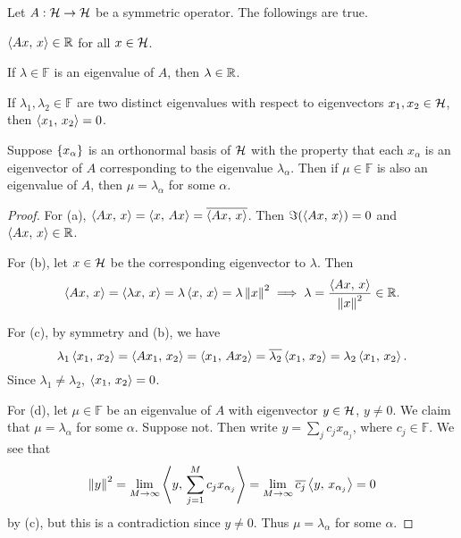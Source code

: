 \begin{proposition}\label{prop:sym_eval}
    Let $A:\mathcal{H}\to\mathcal{H}$ be a symmetric operator. The followings are true. 
    \begin{thmenum}
        \item $\left\langle {Ax},\, {x} \right\rangle\in\mathbb{R}$ for all $x\in\mathcal{H}$.
        \item If $\lambda\in\mathbb{F}$ is an eigenvalue of $A$, then $\lambda\in\mathbb{R}$. 
        \item If $\lambda_1,\lambda_2\in\mathbb{F}$ are two distinct eigenvalues 
        with respect to eigenvectors $x_1,x_2\in\mathcal{H}$, then $\left\langle {x_1},\, {x_2} \right\rangle = 0$. 
        \item Suppose $\left\{ {x_\alpha} \right\}$ is an orthonormal basis of $\mathcal{H}$ with 
        the property that each $x_\alpha$ is an eigenvector of $A$ corresponding 
        to the eigenvalue $\lambda_\alpha$. Then if $\mu\in\mathbb{F}$ is also 
        an eigenvalue of $A$, then $\mu = \lambda_\alpha$ for some $\alpha$.
    \end{thmenum}
\end{proposition}
\begin{proof}
    For (a), $\left\langle {Ax},\, {x} \right\rangle = \left\langle {x},\, {Ax} \right\rangle = \overline{\left\langle {Ax},\, {x} \right\rangle}$. Then 
    $\Im\pth{\inp{Ax}{x}} = 0$ and $\left\langle {Ax},\, {x} \right\rangle\in\mathbb{R}$.

    For (b), let $x\in\mathcal{H}$ be the corresponding eigenvector to $\lambda$. Then 
    \begin{equation*}
        \left\langle {Ax},\, {x} \right\rangle = \left\langle {\lambda x},\, {x} \right\rangle = \lambda\left\langle {x},\, {x} \right\rangle = \lambda\left\lVert {x} \right\rVert^2
        \implies \lambda = \frac{\left\langle {Ax},\, {x} \right\rangle}{\left\lVert {x} \right\rVert^2}\in\mathbb{R}.
    \end{equation*}

    For (c), by symmetry and (b), we have 
    \begin{equation*}
        \lambda_1\left\langle {x_1},\, {x_2} \right\rangle = \left\langle {Ax_1},\, {x_2} \right\rangle = \left\langle {x_1},\, {Ax_2} \right\rangle 
        = \overline{\lambda_2}\left\langle {x_1},\, {x_2} \right\rangle = \lambda_2\left\langle {x_1},\, {x_2} \right\rangle.
    \end{equation*}
    Since $\lambda_1\neq\lambda_2$, $\left\langle {x_1},\, {x_2} \right\rangle = 0$. 

    For (d), let $\mu\in\mathbb{F}$ be an eigenvalue of $A$ with eigenvector 
    $y\in\mathcal{H}$, $y\neq 0$. We claim that $\mu = \lambda_\alpha$ for some $\alpha$. 
    Suppose not. Then write $y = \sum_{j} c_jx_{\alpha_j}$, where $c_j\in\mathbb{F}$. 
    We see that
    \begin{equation*}
        \left\lVert {y} \right\rVert^2 = \lim_{M\to\infty}\left\langle {y},\, {\sum_{j=1}^{M} c_jx_{\alpha_j}} \right\rangle 
        = \lim_{M\to\infty} \overline{c_j}\left\langle {y},\, {x_{\alpha_j}} \right\rangle = 0
    \end{equation*}
    by (c), but this is a contradiction since $y\neq 0$. Thus $\mu = \lambda_\alpha$ 
    for some $\alpha$.
\end{proof}

